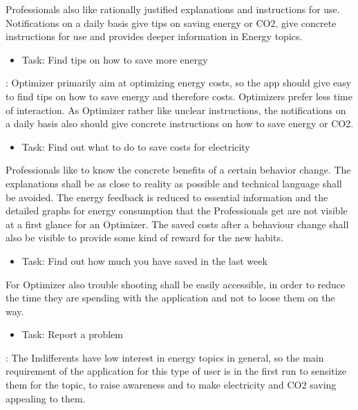 \begin{enumerate}
	Professionals also like rationally justified explanations and instructions for use. Notifications on a daily basis give tips on saving energy or CO2, give concrete instructions for use and provides deeper information in Energy topics.
	
	\begin{itemize}
		\item Task: Find tips on how to save more energy
	\end{itemize}
	
	: Optimizer primarily aim at optimizing energy costs, so the app should give easy to find tips on how to save energy and therefore costs. Optimizers prefer less time of interaction. As Optimizer rather like unclear instructions, the notifications on a daily basis also should give concrete instructions on how to save energy or CO2.
	
	\begin{itemize}
		\item Task: Find out what to do to save costs for electricity
	\end{itemize}
	
	 Professionals like to know the concrete benefits of a certain behavior change. The explanations shall be as close to reality as possible and technical language shall be avoided. The energy feedback is reduced to essential information and the detailed graphs for energy consumption that the Professionals get are not visible at a first glance for an Optimizer. The saved costs after a behaviour change shall also be visible to provide some kind of reward for the new habits.
	 
	 \begin{itemize}
	 	\item Task: Find out how much you have saved in the last week
	 \end{itemize}
	
	For Optimizer also trouble shooting shall be easily accessible, in order to reduce the time they are spending with the application and not to loose them on the way.
	
	\begin{itemize}
		\item Task: Report a problem
	\end{itemize}
	
	:
	The Indifferents have low interest in energy topics in general, so the main requirement of the application for this type of user is in the first run to sensitize them for the topic, to raise awareness and to make electricity and CO2 saving appealing to them. 
	

\end{enumerate}
